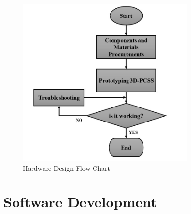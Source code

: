 \begin{figure}[H]
	\centering
	\includegraphics[width=0.8\textwidth]{Figures/hardware_flowchart}
	\caption{Hardware Design Flow Chart}
	\label{ch4:fig:3d-pcss_development_flow_chart}
\end{figure}



\section{Software Development}
\label{ch4:sec:firmware_development_design}

